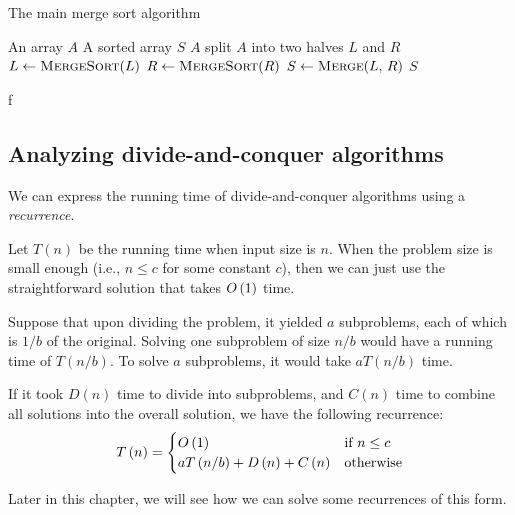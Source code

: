 \begin{algorithm}[H]
    \caption{The main merge sort algorithm}
    \begin{algorithmic}[1]
        \Require An array $A$
        \Ensure A sorted array $S$
            \Return $A$
            \EndIf
            \State split $A$ into two halves $L$ and $R$
            \State $L \gets \text{\Call{MergeSort}{$L$}}$
            \State $R \gets \text{\Call{MergeSort}{$R$}}$
            \State $S \gets \text{\Call{Merge}{$L$, $R$}}$
            \Return $S$
        \EndFunction
    \end{algorithmic}
\end{algorithm}

\begin{example}
f
\end{example}

\subsection{Analyzing divide-and-conquer algorithms}
We can express the running time of divide-and-conquer algorithms using a \textit{recurrence}.

Let $T\left(n\right)$ be the running time when input size is $n$. When the problem size is small enough (i.e., $n \le c$ for some constant $c$), then we can just use the straightforward solution that takes $O\left(1 \right)$ time. 

Suppose that upon dividing the problem, it yielded $a$ subproblems, each of which is $1/b$ of the original. Solving one subproblem of size $n/b$ would have a running time of $T\left(n/b\right)$. To solve $a$ subproblems, it would take $a T\left(n/b\right)$ time.

If it took $D\left(n\right)$ time to divide into subproblems, and $C\left(n\right)$ time to combine all solutions into the overall solution, we have the following recurrence:
\[
T\left(n\right) = \begin{cases}
    O\left(1 \right) & \text{if $n \le c$}\\
    a T\left(n/b\right) + D\left(n\right) + C\left(n\right) & \text{otherwise}
\end{cases}
\]

Later in this chapter, we will see how we can solve some recurrences of this form.

